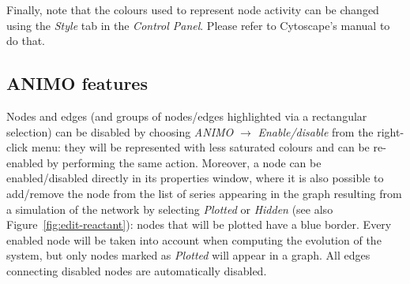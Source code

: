 \documentclass{article}
\begin{document}
Finally, note that the colours used to represent node activity can be changed using the \emph{Style} tab
in the \emph{Control Panel}. Please refer to Cytoscape's manual to do that.
% 


\subsection{ANIMO features}\label{subsec:animo-features}
Nodes and edges (and groups of nodes/edges highlighted via a rectangular selection)
can be disabled by choosing \emph{ANIMO} $\rightarrow$ \emph{Enable/disable} from
the right-click menu: they will be represented with less saturated colours and can be re-enabled by performing
the same action. Moreover, a node can be enabled/disabled directly in its properties window, where it is
also possible to add/remove the node from the list of series appearing in the graph resulting from a simulation
of the network by selecting \emph{Plotted} or \emph{Hidden} (see also Figure~\ref{fig:edit-reactant}):
nodes that will be plotted have a blue border.
Every enabled node will be taken into account when computing the evolution of the system,
but only nodes marked as \emph{Plotted} will appear in a graph. All edges connecting disabled nodes are automatically
disabled.
\end{document}
